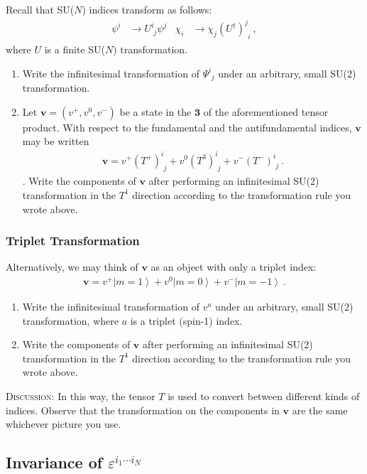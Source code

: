\documentclass[12pt]{article}
\numberwithin{equation}{subsection}    %
\renewcommand{\vec}[1]{\mathbf{#1}} %
\newcommand{\ket}[1]{\left|#1\right\rangle}    %
\begin{document}
Recall that SU($N$) indices transform as follows:
\begin{align}
  \psi^i &\to U^i_{\phantom{i}j} \psi ^j
  &
  \chi_i &\to  \chi_j (U^\dag)^j_{\phantom{j}i} \ ,
\end{align}
where $U$ is a finite SU($N$) transformation.

\begin{enumerate}
  \item Write the infinitesimal transformation of $\Psi^i_{\phantom{i}j}$ under an arbitrary, small SU(2) transformation.
  \item Let $\vec{v} = (v^+, v^0, v^-)$ be a state in the $\mathbf{3}$ of the aforementioned tensor product. With respect to the fundamental and the antifundamental indices, $\mathbf{v}$ may be written
  \begin{align}
    \vec{v} = v^+ (T^+)^i_{\phantom{i}j} + v^0 (T^3)^i_{\phantom{i}j} + v^- (T^-)^i_{\phantom{i}j} \ .
  \end{align}.
  Write the components of $\vec{v}$ after performing an infinitesimal SU(2) transformation in the $T^1$ direction according to the transformation rule you wrote above.
\end{enumerate}

\subsubsection{Triplet Transformation}
Alternatively, we may think of $\vec{v}$ as an object with only a triplet index:
\begin{align}
  \vec{v} = v^+ \ket{m=1} + v^0 \ket{m=0} + v^- \ket{m=-1} \ .
\end{align}
\begin{enumerate}
  \item Write the infinitesimal transformation of $v^a$ under an arbitrary, small SU(2) transformation, where $a$ is a triplet (spin-1) index.
  \item Write the components of $\vec{v}$ after performing an infinitesimal SU(2) transformation in the $T^1$ direction according to the transformation rule you wrote above.
\end{enumerate}

\textsc{Discussion}: In this way, the tensor $T$ is used to convert between different kinds of indices. Observe that the transformation on the components in $\vec{v}$ are the same whichever picture you use.


\subsection{Invariance of $\varepsilon^{i_1\cdots i_N}$}
\end{document}
